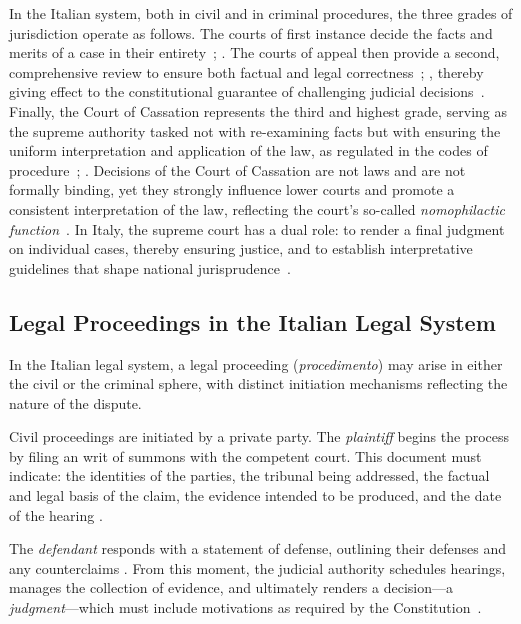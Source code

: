 In the Italian system, both in civil and in criminal procedures, the three grades of jurisdiction operate as follows. The courts of first instance decide the facts and merits of a case in their entirety~\cite[Art.s 99--310]{CPC}; \cite[Art.s 429--544]{CPP}. The courts of appeal then provide a second, comprehensive review to ensure both factual and legal correctness~\cite[Art.s 339--359]{CPC}; \cite[Art.s 593--605]{CPP}, thereby giving effect to the constitutional guarantee of challenging judicial decisions~\cite[Art.~111]{Costituzione}. Finally, the Court of Cassation represents the third and highest grade, serving as the supreme authority tasked not with re-examining facts but with ensuring the uniform interpretation and application of the law, as regulated in the codes of procedure~\cite[Art.~360--382]{CPC}; \cite[Art.~606--613]{CPP}.
Decisions of the Court of Cassation are not laws and are not formally binding, yet they strongly influence lower courts and promote a consistent interpretation of the law, reflecting the court's so-called \emph{nomophilactic function}~\cite{lazovic2022}. In Italy, the supreme court has a dual role: to render a final judgment on individual cases, thereby ensuring justice, and to establish interpretative guidelines that shape national jurisprudence~\cite[Art.~65]{RD1941_12_art65}.


\subsection{Legal Proceedings in the Italian Legal System}

In the Italian legal system, a legal proceeding (\textit{procedimento}) may arise in either the civil or the criminal sphere, with distinct initiation mechanisms reflecting the nature of the dispute.


Civil proceedings are initiated by a private party. The \emph{plaintiff} begins the process by filing an writ of summons with the competent court. This document must indicate: the identities of the parties, the tribunal being addressed, the factual and legal basis of the claim, the evidence intended to be produced, and the date of the hearing \cite[Art.~163]{CPC}. 

The \emph{defendant} responds with a statement of defense, outlining their defenses and any counterclaims \cite[Art.~167]{CPC}. From this moment, the judicial authority schedules hearings, manages the collection of evidence, and ultimately renders a decision---a \emph{judgment}---which must include motivations as required by the Constitution~\cite[Art.~111]{Costituzione}.

